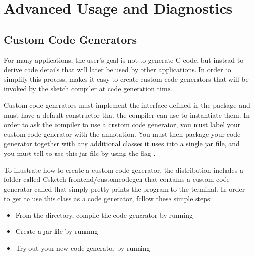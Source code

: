 \section{Advanced Usage and Diagnostics}


\subsection{Custom Code Generators}

For many applications, the user's goal is not to generate C code, but instead to derive code details that will later be used by other applications. In order to simplify this process, \Sk{} makes it easy to create custom code generators that will be invoked by the sketch compiler at code generation time. 

Custom code generators must implement the  interface defined in the  package and must have a default constructor that the compiler can use to instantiate them. In order to ask the compiler to use a custom code generator, you must label your custom code generator with the  annotation. You must then package your code generator together with any additional classes it uses into a single jar file, and you must tell \Sk{} to use this jar file by using the flag . 



To illustrate how to create a custom code generator, the \Sk{} distribution includes a folder called C{sketch-frontend/customcodegen} that contains a custom code generator called  that simply pretty-prints the program to the terminal. In order to get \Sk{} to use this class as a code generator, follow these simple steps:

\begin{itemize}
\item From the  directory, compile the code generator by running \newline
 \version{}
\item Create a jar file by running \newline
{}
\item Try out your new code generator by running \newline
{}
\end{itemize}

